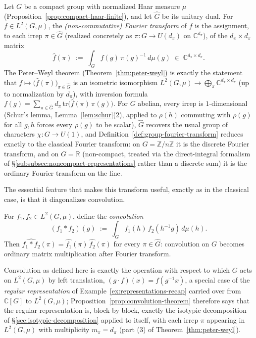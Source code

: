 \documentclass[mathematics,review,submit,moreauthors]{Definitions/mdpi}
\begin{document}
\begin{Definition}
\label{def:group-fourier-transform}
Let $G$ be a compact group with normalized Haar measure $\mu$
(Proposition~\ref{prop:compact-haar-finite}), and let $\widehat{G}$ be its
unitary dual. For $f \in L^2(G,\mu)$, the \emph{(non-commutative) Fourier
transform} of $f$ is the assignment, to each irrep $\pi \in \widehat{G}$
(realized concretely as $\pi : G \to U(d_\pi)$ on $\mathbb{C}^{d_\pi}$), of
the $d_\pi \times d_\pi$ matrix
\[
    \widehat{f}(\pi) \;:=\; \int_G f(g)\, \pi(g)^{-1} \, d\mu(g) \;\in\; \mathbb{C}^{d_\pi \times d_\pi}.
\]
The Peter--Weyl theorem (Theorem~\ref{thm:peter-weyl}) is exactly the
statement that $f \mapsto \big(\widehat{f}(\pi)\big)_{\pi \in \widehat{G}}$
is an isometric isomorphism $L^2(G,\mu) \to \bigoplus_\pi \mathbb{C}^{d_\pi
\times d_\pi}$ (up to normalization by $d_\pi$), with inversion formula
$f(g) = \sum_{\pi \in \widehat{G}} d_\pi \,\mathrm{tr}\bigl(\widehat{f}(\pi)\,\pi(g)\bigr)$.
For $G$ abelian, every irrep is $1$-dimensional (Schur's lemma,
Lemma~\ref{lem:schur}(2), applied to $\rho(h)$ commuting with $\rho(g)$ for
all $g,h$ forces every $\rho(g)$ to be scalar), $\widehat{G}$ recovers the
usual group of characters $\chi : G \to U(1)$, and
Definition~\ref{def:group-fourier-transform} reduces exactly to the
classical Fourier transform: on $G = \mathbb{Z}/n\mathbb{Z}$ it is the
discrete Fourier transform, and on $G = \mathbb{R}$ (non-compact, treated
via the direct-integral formalism of
\S\ref{subsubsec:noncompact-representations} rather than a discrete sum) it
is the ordinary Fourier transform on the line.
\end{Definition}

The essential feature that makes this transform useful, exactly as in the
classical case, is that it diagonalizes convolution.

\begin{Proposition}
\label{prop:convolution-theorem}
For $f_1, f_2 \in L^2(G,\mu)$, define the \emph{convolution}
\[
    (f_1 * f_2)(g) \;:=\; \int_G f_1(h)\, f_2(h^{-1}g)\, d\mu(h).
\]
Then $\widehat{f_1 * f_2}(\pi) = \widehat{f_1}(\pi)\, \widehat{f_2}(\pi)$ for
every $\pi \in \widehat{G}$: convolution on $G$ becomes ordinary matrix
multiplication after Fourier transform.
\end{Proposition}

Convolution as defined here is exactly the operation with respect to which
$G$ acts on $L^2(G,\mu)$ by left translation, $(g \cdot f)(x) = f(g^{-1}x)$,
a special case of the \emph{regular representation} of
Example~\ref{ex:representations-recap} carried over from $\mathbb{C}[G]$ to
$L^2(G,\mu)$; Proposition~\ref{prop:convolution-theorem} therefore says that
the regular representation is, block by block, exactly the isotypic
decomposition of \S\ref{sec:isotypic-decomposition} applied to itself,
with each irrep $\pi$ appearing in $L^2(G,\mu)$ with multiplicity
$m_\pi = d_\pi$ (part (3) of Theorem~\ref{thm:peter-weyl}).
\end{document}
